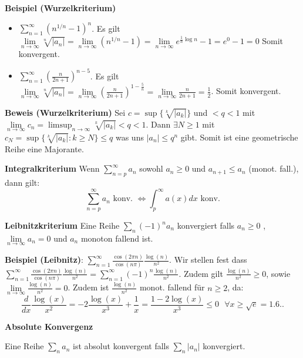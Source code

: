 \documentclass[25pt]{sciposter}
\newcommand{\limm}{\lim\limits_{n \to \infty}}
\newenvironment{method}[1]{\begin{mdframed}[backgroundcolor=blue!10,innertopmargin=15pt, innerbottommargin=15pt, nobreak=true]
		\textbf{#1 }
	}
	{ 
	\end{mdframed}
}
\begin{document}
\begin{multicols}{3}
\textbf{Beispiel (Wurzelkriterium)}
\begin{itemize}
	\item $\sum_{n=1}^{\infty} \left( n^{1/n} -1 \right)^n $. Es gilt $\limm \sqrt[n]{|a_n|} = \limm (n^{1/n}-1) = \limm e^{\frac{1}{n}\log n} -1 = e^0-1 = 0$ Somit konvergent.
	
	\item $\sum_{n=1}^{\infty} \left(\frac{n}{2n+1}\right) ^{n-5}$. Es gilt $\limm \sqrt[n]{|a_n|} = \limm \left( \frac{n}{2n+1} \right)^{1-\frac{5}{n}} = \limm\frac{n}{2n+1} = \frac{1}{2}$. Somit konvergent.
\end{itemize}


\textbf{Beweis (Wurzelkriterium)}
Sei $c = \sup \{\sqrt[k]{|a_k|}\}$ und $ < q< 1$ mit $\limm c_n = \limsup_{n\to \infty} \sqrt[k]{|a_k|} < q <1$. Dann $\exists N \geq 1$ mit $ c_N = \sup\{ \sqrt[k]{|a_k|}: k\geq N \} \leq q$ was uns $|a_n| \leq q^n$ gibt. Somit ist eine geometrische Reihe eine Majorante.


\begin{method}{Integralkriterium} Wenn $\sum_{n=p}^{\infty} a_n$ sowohl $a_n \geq 0$ und $a_{n+1} \leq a_n$ (monot. fall.), dann gilt:
$$\sum_{n=p}^{\infty} a_n \text{ konv. } \iff \int_{p}^{\infty} a(x) dx \text{ konv.}$$
\end{method}


\begin{method}{Leibnitzkriterium} Eine Reihe $\sum_n (-1)^n a_n$ konvergiert falls $a_n \geq 0$ , $\lim\limits_{n \to \infty } a_n = 0$ und $a_n$ monoton fallend ist.
\end{method}

\textbf{Beispiel (Leibnitz)}: $\sum_{n = 1}^{\infty} \frac{\cos(2\pi n)}{\cos(n \pi)} \frac{\log(n)}{n^2}$. Wir stellen fest dass $\sum_{n = 1}^{\infty} \frac{\cos(2\pi n)}{\cos(n \pi)} \frac{\log(n)}{n^2} = \sum_{n = 1}^{\infty} (-1)^n \frac{\log(n)}{n^2}$. Zudem gilt $\frac{\log(n)}{n^2} \geq 0$, sowie $\lim\limits_{n \to \infty} \frac{\log(n)}{n^2} = 0$. Zudem ist $\frac{\log(n)}{n^2}$ monot. fallend für $n \geq 2$, da: 
$$ \frac{d}{dx} \frac{\log(x)}{x^2} = -2 \frac{\log(x)}{x^3} + \frac{1}{x} = \frac{1- 2\log(x)}{x^3} \leq 0\text{ } \forall x \geq \sqrt{e} = 1.6..$$





\begin{method}{Absolute Konvergenz}
	Eine Reihe $\sum_{n} a_n$ ist absolut konvergent falls $\sum_{n} |a_n|$ konvergiert.
\end{method}


\end{multicols}
\end{document}
